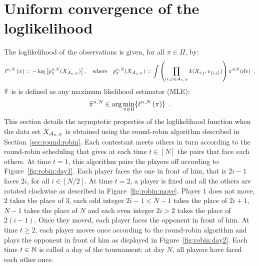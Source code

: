 \section{Uniform convergence of the loglikelihood}
\label{sec:likelihood}
The loglikelihood of the observations is given, for all $\pi\in\Pi$, by:
\[
\ell^{n,N}\left(\pi\right) =-\log\left[p^{n,N}_{\pi}(X_{\mathcal{A}_{n,N}})\right],\quad \text{where}\quad p^{n,N}_{\pi}(X_{\mathcal{A}_{n,N}})=\int  \left(\prod_{(i,j)\in \mathcal{A}_{n,N}}k(X_{i,j},v_{\{i,j\}})\right)\pi^{\otimes N}(dv)\enspace.
\]
$\widehat{\pi}$ is is defined as any maximum likelihood estimator (MLE):
\[
\widehat{\pi}^{n,N}\in \arg\min_{\pi\in\Pi}\{\ell^{n,N}\left(\pi\right)\}\enspace.
\]
This section details the asymptotic properties of the loglikelihood function when the data set $X_{\mathcal{A}_{n,N}}$ is obtained using the round-robin algorithm described in Section~\ref{sec:round:robin}.  Each contestant meets others in turn according to  the round-robin scheduling that gives at each time $t\in[N]$ the pairs that face each others. At time $t=1$, this algorithm pairs the players off according to Figure~\ref{fig:robin:day1}. Each player faces the one in front of him, that is $2i-1$ faces $2i$, for all $i\in[N/2]$. At time $t=2$, a player is fixed and all the others are rotated clockwise as described in Figure~\ref{fig:robin:move}. Player $1$ does not move, $2$ takes the place of $3$, each odd integer $2i-1<N-1$ takes the place of $2i+1$, $N-1$ takes the place of $N$ and each even integer $2i>2$ takes the place of $2(i-1)$. Once they moved, each player faces the opponent in front of him. At time $t\ge 2$, each player moves once according to the round-robin algorithm and plays the opponent in front of him as displayed in Figure~\ref{fig:robin:day2}. Each time $t\in\mathbb{N}$ is called a day of the tournament: at day $N$, all players have faced each other once. 


